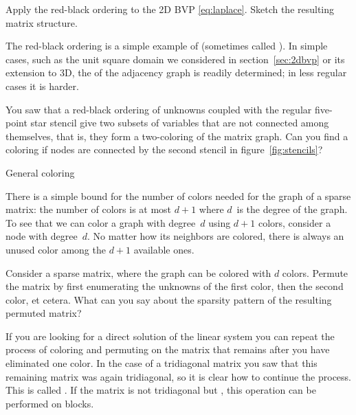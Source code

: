 \begin{exercise}
  Apply the red-black ordering to the 2D \ac{BVP} \eqref{eq:laplace}.
  Sketch the resulting matrix structure.
\end{exercise}

The red-black ordering is a simple
example of  (sometimes called
). In
simple cases, such as the unit square domain we considered in
section~\ref{sec:2dbvp} or its extension to 3D,
the  of the adjacency graph is readily determined;
in less regular cases it is harder.

\begin{exercise}
  You saw that a red-black ordering of unknowns
  coupled with the regular five-point star stencil give two subsets of
  variables that are not connected among themselves, that is, 
  they form a two-coloring of the matrix graph. 
  Can you find a coloring if nodes are connected by the second stencil in
  figure~\ref{fig:stencils}?
\end{exercise}


 {General coloring}
\label{sec:multi-color}

There is a simple bound for the number of colors needed for the graph
of a sparse matrix: the number of colors is at most $d+1$ where
$d$~is the degree of the graph. To see that we can color a graph with
degree~$d$ using $d+1$ colors, consider a node with
degree~$d$. No matter how its neighbors are colored, there is always
an unused color among the $d+1$ available ones.

\begin{exercise}
  Consider a sparse matrix, where the graph can be colored with $d$
  colors. Permute the matrix by first enumerating the unknowns of the
  first color,
  then the second color, et cetera. What can you say about the
  sparsity pattern of the resulting permuted matrix?
\end{exercise}

If you
are looking for a direct solution of the linear system you can repeat
the process of coloring and permuting on the matrix that remains
after you have eliminated one color. In the case of a tridiagonal
matrix you saw that this remaining matrix was again tridiagonal, so
it is clear how to continue the process. This is called
. If the matrix is not tridiagonal but
, this operation can be performed on
blocks.

